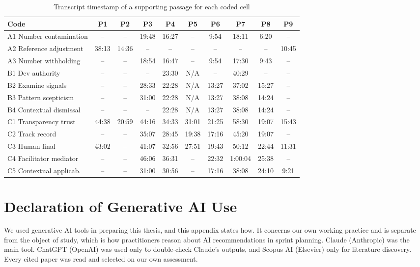 \documentclass[a4paper,twoside]{bth}
\begin{document}
\begin{table}[htb]
\caption{Transcript timestamp of a supporting passage for each coded cell}
\label{tab:codingmatrix}
\centering
\footnotesize
\setlength{\tabcolsep}{3.5pt}
\begin{tabular}{lccccccccc}
\toprule
Code & P1 & P2 & P3 & P4 & P5 & P6 & P7 & P8 & P9 \\
\midrule
A1 Number contamination & -- & -- & 19:48 & 16:27 & -- & 9:54 & 18:11 & 6:20 & -- \\
A2 Reference adjustment & 38:13 & 14:36 & -- & -- & -- & -- & -- & -- & 10:45 \\
A3 Number withholding & -- & -- & 18:54 & 16:47 & -- & 9:54 & 17:30 & 9:43 & -- \\
B1 Dev authority & -- & -- & -- & 23:30 & N/A & -- & 40:29 & -- & -- \\
B2 Examine signals & -- & -- & 28:33 & 22:28 & N/A & 13:27 & 37:02 & 15:27 & -- \\
B3 Pattern scepticism & -- & -- & 31:00 & 22:28 & N/A & 13:27 & 38:08 & 14:24 & -- \\
B4 Contextual dismissal & -- & -- & -- & 22:28 & N/A & 13:27 & 38:08 & 14:24 & -- \\
C1 Transparency trust & 44:38 & 20:59 & 44:16 & 34:33 & 31:01 & 21:25 & 58:30 & 19:07 & 15:43 \\
C2 Track record & -- & -- & 35:07 & 28:45 & 19:38 & 17:16 & 45:20 & 19:07 & -- \\
C3 Human final & 43:02 & -- & 41:07 & 32:56 & 27:51 & 19:43 & 50:12 & 22:44 & 11:31 \\
C4 Facilitator mediator & -- & -- & 46:06 & 36:31 & -- & 22:32 & 1:00:04 & 25:38 & -- \\
C5 Contextual applicab. & -- & -- & 31:00 & 30:56 & -- & 17:16 & 38:08 & 24:10 & 9:21 \\
\bottomrule
\end{tabular}
\end{table}


\chapter{Declaration of Generative AI Use}
\label{app:genai}

We used generative AI tools in preparing this thesis, and this appendix states how. It concerns our own working practice and is separate from the object of study, which is how practitioners reason about AI recommendations in sprint planning. Claude (Anthropic) was the main tool. ChatGPT (OpenAI) was used only to double-check Claude's outputs, and Scopus AI (Elsevier) only for literature discovery. Every cited paper was read and selected on our own assessment.
\end{document}
